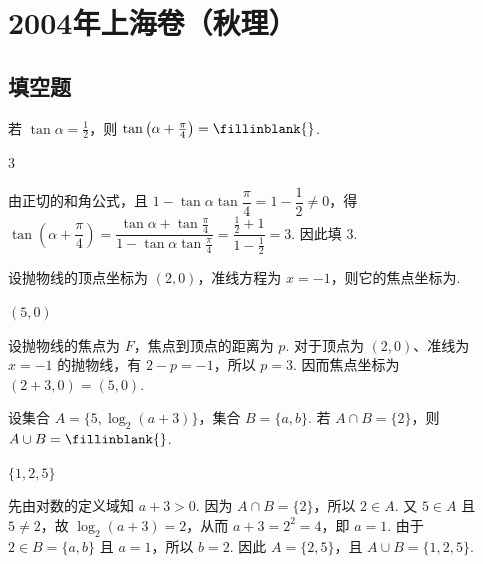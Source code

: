 
\chapter{2004年上海卷（秋理）}
\section{填空题}
\begin{problem}
若 \(\tan \alpha = \frac{1}{2}\)，则 \(\tan \left(\alpha + \frac{\pi}{4}\right) =\fillinblank{}\).
\end{problem}

\begin{answer}
\(3\)
\end{answer}

\begin{solution}
由正切的和角公式，且 \(1-\tan\alpha\tan\dfrac{\pi}{4}=1-\dfrac12\ne0\)，得
\(\tan\left(\alpha+\dfrac{\pi}{4}\right)=\dfrac{\tan\alpha+\tan\frac{\pi}{4}}{1-\tan\alpha\tan\frac{\pi}{4}}=\dfrac{\frac12+1}{1-\frac12}=3\). 因此填 \(3\).
\end{solution}

\begin{problem}
设抛物线的顶点坐标为 \((2,0)\)，准线方程为 \(x = -1\)，则它的焦点坐标为\fillinblank{}.
\end{problem}

\begin{answer}
\((5,0)\)
\end{answer}

\begin{solution}
设抛物线的焦点为 \(F\)，焦点到顶点的距离为 \(p\). 对于顶点为 \((2,0)\)、准线为 \(x=-1\) 的抛物线，有 \(2-p=-1\)，所以 \(p=3\). 因而焦点坐标为 \((2+3,0)=(5,0)\).
\end{solution}

\begin{problem}
设集合 \(A = \{5, \log_2(a + 3)\}\)，集合 \(B = \{a, b\}\). 若 \(A \cap B = \{2\}\)，则 \(A \cup B =\fillinblank{}\).

\end{problem}

\begin{answer}
\(\{1,2,5\}\)
\end{answer}

\begin{solution}
先由对数的定义域知 \(a+3>0\). 因为 \(A\cap B=\{2\}\)，所以 \(2\in A\). 又 \(5\in A\) 且 \(5\ne2\)，故 \(\log_{2}(a+3)=2\)，从而 \(a+3=2^{2}=4\)，即 \(a=1\). 由于 \(2\in B=\{a,b\}\) 且 \(a=1\)，所以 \(b=2\). 因此 \(A=\{2,5\}\)，且 \(A\cup B=\{1,2,5\}\).
\end{solution}

